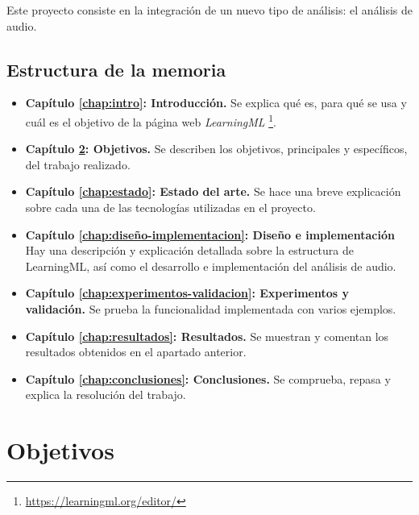 \documentclass[a4paper, 12pt]{book}
\begin{document}
Este proyecto consiste en la integración de un nuevo tipo de análisis: el análisis de audio.

\section{Estructura de la memoria}
\label{sec:estructura}

\begin{itemize}
  \item \textbf{Capítulo \ref{chap:intro}: Introducción. } Se explica qué es, para qué se usa  y cuál es el objetivo de la página web \textit{LearningML} \footnote{\url{https://learningml.org/editor/}}.
  
  \item \textbf{Capítulo \ref{chap:objetivos}: Objetivos. } Se describen los objetivos, principales y específicos, del trabajo realizado.
  
  \item \textbf{Capítulo \ref{chap:estado}: Estado del arte. } Se hace una breve explicación sobre cada una de las tecnologías utilizadas en el proyecto.
  
  \item \textbf{Capítulo \ref{chap:diseño-implementacion}: Diseño e implementación } Hay una descripción y explicación detallada sobre la estructura de LearningML, así como el desarrollo e implementación del análisis de audio.
  
  \item \textbf{Capítulo \ref{chap:experimentos-validacion}: Experimentos y validación. } Se prueba la funcionalidad implementada con varios ejemplos.
  
  \item \textbf{Capítulo \ref{chap:resultados}: Resultados. } Se muestran y comentan los resultados obtenidos en el apartado anterior.
  
  \item \textbf{Capítulo \ref{chap:conclusiones}: Conclusiones. } Se comprueba, repasa y explica la resolución del trabajo.
 
\end{itemize}


\cleardoublepage %
\chapter{Objetivos} %
\label{chap:objetivos} %
\end{document}
